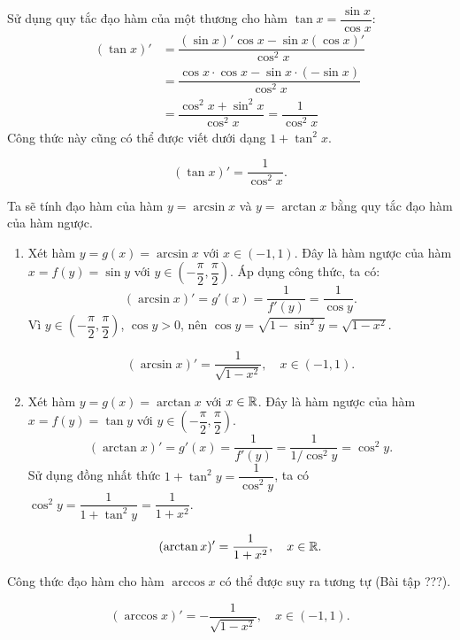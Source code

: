 \begin{example}
    Sử dụng quy tắc đạo hàm của một thương cho hàm $\tan x = \dfrac{\sin x}{\cos x}$:
    \begin{align*}
        (\tan x)' &= \dfrac{(\sin x)' \cos x - \sin x (\cos x)'}{\cos^2 x} \\ 
                  &= \dfrac{\cos x \cdot \cos x - \sin x \cdot (-\sin x)}{\cos^2 x} \\
                  &= \dfrac{\cos^2 x + \sin^2 x}{\cos^2 x} = \dfrac{1}{\cos^2 x}
    \end{align*}
    Công thức này cũng có thể được viết dưới dạng $1 + \tan^2 x$.
    \begin{importantbox}
        \[ (\tan x)' = \dfrac{1}{\cos^2 x}. \]
    \end{importantbox}
\end{example}

\begin{example}
    Ta sẽ tính đạo hàm của hàm $y = \arcsin x$ và $y = \arctan x$ bằng quy tắc đạo hàm của hàm ngược.
    \begin{enumerate}[label=(\alph*)]
        \item Xét hàm $y = g(x) = \arcsin x$ với $x \in (-1, 1)$. Đây là hàm ngược của hàm $x = f(y) = \sin y$ với $y \in \left(-\dfrac{\pi}{2}, \dfrac{\pi}{2}\right)$. Áp dụng công thức, ta có:
        \[ (\arcsin x)' = g'(x) = \dfrac{1}{f'(y)} = \dfrac{1}{\cos y}. \]
        Vì $y \in \left(-\dfrac{\pi}{2}, \dfrac{\pi}{2}\right)$, $\cos y > 0$, nên $\cos y = \sqrt{1-\sin^2 y} = \sqrt{1-x^2}$.
        \begin{importantbox}
        \[ (\arcsin x)' = \dfrac{1}{\sqrt{1-x^2}},\quad x \in (-1, 1). \]
        \end{importantbox}
        \item Xét hàm $y = g(x) = \arctan x$ với $x \in \mathbb{R}$. Đây là hàm ngược của hàm $x = f(y) = \tan y$ với $y \in \left(-\dfrac{\pi}{2}, \dfrac{\pi}{2}\right)$.
        \[ (\arctan x)' = g'(x) = \dfrac{1}{f'(y)} = \dfrac{1}{1/\cos^2 y} = \cos^2 y. \]
        Sử dụng đồng nhất thức $1 + \tan^2 y = \dfrac{1}{\cos^2 y}$, ta có $\cos^2 y = \dfrac{1}{1+\tan^2 y} = \dfrac{1}{1+x^2}$.
        \begin{importantbox}
        \[ (\arctan x)' = \dfrac{1}{1+x^2},\quad x \in \mathbb{R}. \]
        \end{importantbox}
    \end{enumerate}
    Công thức đạo hàm cho hàm $\arccos x$ có thể được suy ra tương tự (Bài tập ???).
    \begin{importantbox}
    \[ (\arccos x)' = -\dfrac{1}{\sqrt{1-x^2}},\quad x \in (-1, 1). \]
    \end{importantbox}
\end{example}


